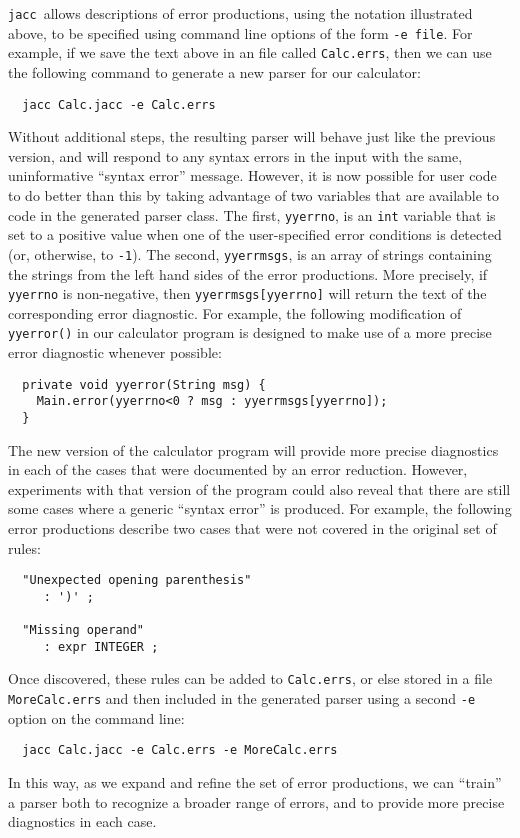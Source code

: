 \documentclass[12pt]{article}
\def\jacc{{\tt jacc}}
\begin{document}
\jacc\ allows descriptions of error productions, using the notation
illustrated above, to be specified using command line options of the
form \verb"-e file".  For example, if we save the text above in an
file called \verb"Calc.errs", then we can use the following
command to generate a new parser for our calculator:
{\small
\begin{verbatim}
  jacc Calc.jacc -e Calc.errs
\end{verbatim}
}%
Without additional steps, the resulting parser will behave just
like the previous version, and will respond to any syntax errors
in the input with the same, uninformative ``syntax error'' message.
However, it is now possible for user code to do better than this
by taking advantage of two variables that are available to code
in the generated parser class.  The first, \verb"yyerrno", is an
\verb"int" variable that is set to a positive value when one of
the user-specified error conditions is detected (or, otherwise,
to \verb"-1").  The second, \verb"yyerrmsgs", is an array
of strings containing the strings from the left hand sides of
the error productions.  More precisely, if \verb"yyerrno" is
non-negative, then \verb"yyerrmsgs[yyerrno]" will return the
text of the corresponding error diagnostic.
For example, the following modification of \verb"yyerror()" in
our calculator program is designed to make use of a more precise
error diagnostic whenever possible:
{\small
\begin{verbatim}
  private void yyerror(String msg) {
    Main.error(yyerrno<0 ? msg : yyerrmsgs[yyerrno]);
  }
\end{verbatim}
}%

The new version of the calculator program will provide more
precise diagnostics in each of the cases that were documented
by an error reduction.  However, experiments with that version
of the program could also reveal that there are still some
cases where a generic ``syntax error'' is produced.  For example,
the following error productions describe two cases that were not
covered in the original set of rules:
{\small
\begin{verbatim}
  "Unexpected opening parenthesis"
     : ')' ;

  "Missing operand"
     : expr INTEGER ;
\end{verbatim}
}%
Once discovered, these rules can be added to \verb"Calc.errs",
or else stored in a file \verb"MoreCalc.errs" and then included
in the generated parser using a second \verb"-e" option on the
command line:
{\small
\begin{verbatim}
  jacc Calc.jacc -e Calc.errs -e MoreCalc.errs
\end{verbatim}
}%
In this way, as we expand and refine the set of error
productions, we can ``train'' a parser both to recognize a broader
range of errors, and to provide more precise diagnostics in each
case.
\end{document}
